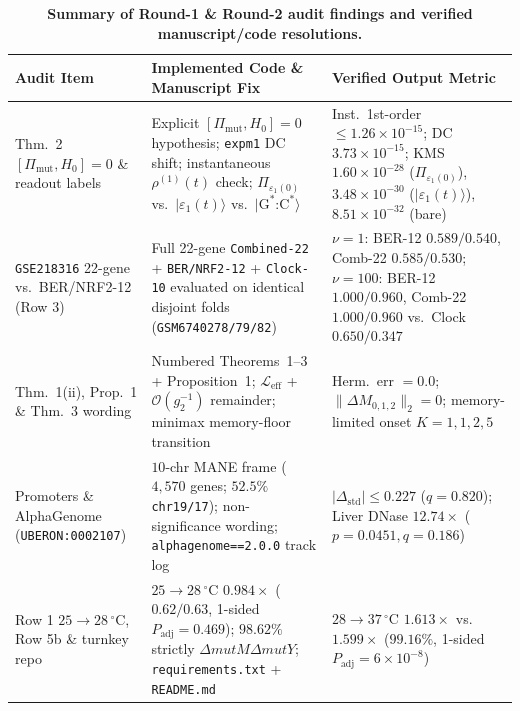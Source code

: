 \documentclass[10pt,letterpaper]{article}
\newcommand{\Lcal}{\mathcal{L}}
\begin{document}
\vspace{0.5em}
\begin{table}[!h]
\centering
\caption{\textbf{Summary of Round-1 \& Round-2 audit findings and verified manuscript/code resolutions.}}
\scriptsize
\begin{tabularx}{\textwidth}{@{}>{\raggedright\arraybackslash}p{3.2cm}>{\raggedright\arraybackslash}X>{\raggedright\arraybackslash}p{4.4cm}@{}}
\toprule
\textbf{Audit Item} & \textbf{Implemented Code \& Manuscript Fix} & \textbf{Verified Output Metric} \\
\midrule
Thm.~2 $[\Pi_{\mathrm{mut}}, H_0]=0$ \& readout labels & Explicit $[\Pi_{\mathrm{mut}}, H_0]=0$ hypothesis; \texttt{expm1} DC shift; instantaneous $\rho^{(1)}(t)$ check; $\Pi_{\varepsilon_1(0)}$ vs.\ $|\varepsilon_1(t)\rangle$ vs.\ $|\mathrm{G}^*\text{:}\mathrm{C}^*\rangle$ & Inst.\ 1st-order $\le 1.26\times 10^{-15}$; DC $3.73\times 10^{-15}$; KMS $1.60\times 10^{-28}$ ($\Pi_{\varepsilon_1(0)}$), $3.48\times 10^{-30}$ ($|\varepsilon_1(t)\rangle$), $8.51\times 10^{-32}$ (bare) \\
\addlinespace[2pt]
\texttt{GSE218316} 22-gene vs.\ BER/NRF2-12 (Row 3) & Full 22-gene \texttt{Combined-22} + \texttt{BER/NRF2-12} + \texttt{Clock-10} evaluated on identical disjoint folds (\texttt{GSM6740278/79/82}) & $\nu=1$: BER-12 $0.589/0.540$, Comb-22 $0.585/0.530$; $\nu=100$: BER-12 $1.000/0.960$, Comb-22 $1.000/0.960$ vs.\ Clock $0.650/0.347$ \\
\addlinespace[2pt]
Thm.~1(ii), Prop.~1 \& Thm.~3 wording & Numbered Theorems~1--3 + Proposition~1; $\Lcal_{\mathrm{eff}}$ + $\mathcal{O}(g_2^{-1})$ remainder; minimax memory-floor transition & Herm.\ err $= 0.0$; $\|\Delta M_{0,1,2}\|_2=0$; memory-limited onset $K=1,1,2,5$ \\
\addlinespace[2pt]
Promoters \& AlphaGenome (\texttt{UBERON:0002107}) & $10$-chr MANE frame ($4{,}570$ genes; $52.5\%$ \texttt{chr19/17}); non-significance wording; \texttt{alphagenome==2.0.0} track log & $|\Delta_{\mathrm{std}}| \le 0.227$ ($q=0.820$); Liver DNase $12.74\times$ ($p=0.0451, q=0.186$) \\
\addlinespace[2pt]
Row 1 $25\to 28\,^\circ\mathrm{C}$, Row 5b \& turnkey repo & $25\to 28\,^\circ\mathrm{C}$ $0.984\times$ ($0.62/0.63$, 1-sided $P_{\mathrm{adj}}=0.469$); $98.62\%$ strictly $\Delta\textit{mutM}\Delta\textit{mutY}$; \texttt{requirements.txt} + \texttt{README.md} & $28\to 37\,^\circ\mathrm{C}$ $1.613\times$ vs.\ $1.599\times$ ($99.16\%$, 1-sided $P_{\mathrm{adj}}=6\times 10^{-8}$) \\
\bottomrule
\end{tabularx}
\end{table}
\end{document}
